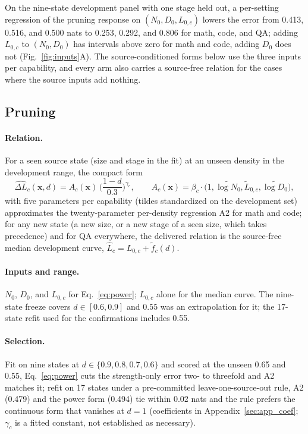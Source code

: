 On the nine-state development panel with one stage held out, a
per-setting regression of the pruning response on $(N_0,D_0,L_{0,c})$
lowers the error from 0.413, 0.516, and 0.500 nats to 0.253, 0.292,
and 0.806 for math, code, and QA; adding $L_{0,c}$ to $(N_0,D_0)$ has
intervals above zero for math and code, adding $D_0$ does not
(Fig.~\ref{fig:inputs}A). The source-conditioned forms below use the
three inputs per capability, and every arm also carries a source-free
relation for the cases where the source inputs add nothing.

\subsection{Pruning}
\label{sec:law_prune}

\paragraph{Relation.} For a seen source state (size and stage in the fit) at an unseen density in the development range, the compact form
\begin{equation}
\widehat{\Delta L}_c(\mathbf x,d)=A_c(\mathbf x)\,\Big(\frac{1-d}{0.3}\Big)^{\gamma_c},
\qquad
A_c(\mathbf x)=\beta_c\cdot\big(1,\tilde{\log N_0},\tilde L_{0,c},\tilde{\log D_0}\big),
\label{eq:power}
\end{equation}
with five parameters per capability (tildes standardized on the
development set) approximates the twenty-parameter per-density regression A2 for math and code; for any new state (a new size, or a new stage of a seen size, which takes precedence) and for QA everywhere, the delivered relation is the source-free median development curve,
$\widehat L_c=L_{0,c}+\widetilde f_c(d)$.
\paragraph{Inputs and range.} $N_0$, $D_0$, and $L_{0,c}$ for
Eq.~\ref{eq:power}; $L_{0,c}$ alone for the median curve. The
nine-state freeze covers $d\in[0.6,0.9]$ and $0.55$ was an
extrapolation for it; the 17-state refit used for the confirmations
includes 0.55.
\paragraph{Selection.} Fit on nine states at $d\in\{0.9,0.8,0.7,0.6\}$
and scored at the unseen 0.65 and 0.55, Eq.~\ref{eq:power} cuts the
strength-only error two- to threefold and A2 matches it; refit on 17
states under a pre-committed leave-one-source-out rule, A2 (0.479)
and the power form (0.494) tie within 0.02 nats and the rule prefers
the continuous form that vanishes at $d=1$ (coefficients in
Appendix~\ref{sec:app_coef}; $\gamma_c$ is a fitted constant, not
established as necessary).
